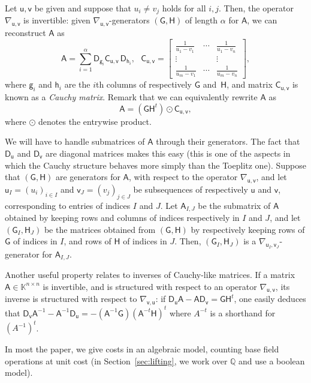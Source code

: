 \documentclass{sig-alternate}
\newcommand{\vg}{\ensuremath{\mathsf{g}}}
\newcommand{\vh}{\ensuremath{\mathsf{h}}}
\newcommand{\vu}{\ensuremath{\mathsf{u}}}
\newcommand{\vv}{\ensuremath{\mathsf{v}}}
\newcommand{\mA}{\ensuremath{\mathsf{A}}}
\newcommand{\mC}{\ensuremath{\mathsf{C}}}
\newcommand{\mD}{\ensuremath{\mathsf{D}}}
\newcommand{\mG}{\ensuremath{\mathsf{G}}}
\newcommand{\mH}{\ensuremath{\mathsf{H}}}
\newcommand{\K}{\ensuremath{\mathbb{K}}}
\newcommand{\Q}{\ensuremath{\mathbb{Q}}}
\begin{document}
Let $\vu,\vv$ be given and suppose that $u_i \ne v_j$ holds for all
$i,j$. Then, the operator $\nabla_{\vu,\vv}$ is invertible: given
$\nabla_{\vu,\vv}$-generators $(\mG,\mH)$ of length $\alpha$ for $\mA$, we can reconstruct $\mA$ as
\begin{equation}\label{eq:recA}
\mA = \sum_{i=1}^\alpha
\mD_{\vg_i} 
\mC_{\vu,\vv}\,\mD_{\vh_i},\ \ \ 
\mC_{\vu,\vv}=\begin{bmatrix}
\frac 1{u_1-v_1} & \cdots & \frac 1{u_1-v_n}\\
\vdots & & \vdots \\
\frac 1{u_m-v_1} & \cdots & \frac 1{u_m-v_n}
\end{bmatrix}, 
\end{equation}
where $\vg_i$ and $\vh_i$ are the $i$th columns of respectively $\mG$
and~$\mH$, and  matrix $\mC_{\vu,\vv}$ is known as a {\em Cauchy
  matrix}. Remark that we can
equivalently rewrite $\mA$ as
\begin{equation}\label{eq:recA2}
\mA= (\mG \mH^t) \odot \mC_{\vu,\vv},
\end{equation}
where $\odot$ denotes the entrywise product.

We will have to handle submatrices of $\mA$ through their
generators. The fact that $\mD_{\vu}$ and $\mD_{\vv}$ are diagonal
matrices makes this easy (this is one of the aspects in which the
Cauchy structure behaves more simply than the Toeplitz one).  Suppose
that $(\mG,\mH)$ are generators for $\mA$, with respect to the
operator $\nabla_{\vu,\vv}$, and let $\vu_I=(u_i)_{i \in I}$ and
$\vv_J=(v_j)_{j \in J}$ be subsequences of respectively $\vu$ and
$\vv$, corresponding to entries of indices $I$ and $J$. Let
$\mA_{I,J}$ be the submatrix of $\mA$ obtained by keeping rows and
columns of indices respectively in $I$ and $J$, and let
$(\mG_I,\mH_J)$ be the matrices obtained from $(\mG,\mH)$ by
respectively keeping rows of $\mG$ of indices in $I$, and rows of
$\mH$ of indices in $J$. Then, $(\mG_I,\mH_J)$ is a
$\nabla_{\vu_I,\vv_J}$-generator for $\mA_{I,J}$.

Another useful property relates to inverses of Cauchy-like matrices.
If a matrix $\mA \in \K^{n\times n}$ is invertible, and is structured
with respect to an operator $\nabla_{\vu,\vv}$, its inverse is
structured with respect to $\nabla_{\vv,\vu}$: if $\mD_\vu \mA - \mA
\mD_\vv = \mG \mH^t$, one easily deduces that $\mD_\vv \mA^{-1} - \mA^{-1}
\mD_\vu = - (\mA^{-1} \mG) (\mA^{-t} \mH)^t$ where $A^{-t}$ is a shorthand 
for $(A^{-1})^t$.


\smallskip{}  In most the paper, we
give costs in an algebraic model, counting base field operations at
unit cost (in Section~\ref{sec:lifting}, we work over $\Q$ and use 
a boolean model).
\end{document}
